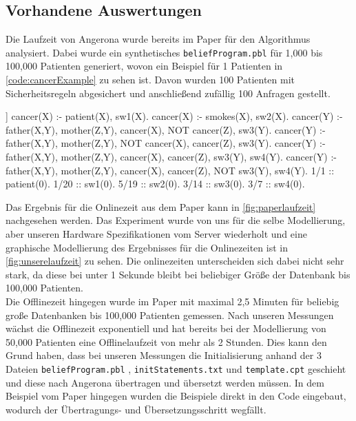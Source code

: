 \documentclass[german,version-2020-11]{uzl-thesis}
\begin{document}
\subsection{Vorhandene Auswertungen}
Die Laufzeit von Angerona wurde bereits im Paper für den Algorithmus analysiert. Dabei wurde ein synthetisches \texttt{beliefProgram.pbl} für 1,000 bis 100,000 Patienten generiert, wovon ein Beispiel für 1 Patienten in \autoref{code:cancerExample} zu sehen ist. Davon wurden 100 Patienten mit Sicherheitsregeln abgesichert und anschließend zufällig 100 Anfragen gestellt. \\ 
\begin{Pseudocode}[caption={\texttt{beliefProgram.pbl} für das Beispiel aus dem Paper \cite{6}}, label={code:cancerExample}]]
cancer(X) :- patient(X), sw1(X).
cancer(X) :- smokes(X), sw2(X).
cancer(Y) :- father(X,Y), mother(Z,Y), cancer(X), NOT cancer(Z), sw3(Y).
cancer(Y) :- father(X,Y), mother(Z,Y), NOT cancer(X), cancer(Z), sw3(Y).
cancer(Y) :- father(X,Y), mother(Z,Y), cancer(X), cancer(Z), sw3(Y), sw4(Y).
cancer(Y) :- father(X,Y), mother(Z,Y), cancer(X), cancer(Z), NOT sw3(Y), sw4(Y).
1/1 :: patient(0).
1/20 :: sw1(0).
5/19 :: sw2(0).
3/14 :: sw3(0).
3/7 :: sw4(0).
\end{Pseudocode}
Das Ergebnis für die Onlinezeit aus dem Paper kann in \autoref{fig:paperlaufzeit} nachgesehen werden. Das Experiment wurde von uns für die selbe Modellierung, aber unseren Hardware Spezifikationen vom Server wiederholt und eine graphische Modellierung des Ergebnisses für die Onlinezeiten ist in \autoref{fig:unserelaufzeit} zu sehen. Die onlinezeiten unterscheiden sich dabei nicht sehr stark, da diese bei unter 1 Sekunde bleibt bei beliebiger Größe der Datenbank bis 100,000 Patienten. \\
Die Offlinezeit hingegen wurde im Paper mit maximal 2,5 Minuten für beliebig große Datenbanken bis 100,000 Patienten gemessen. Nach unseren Messungen wächst die Offlinezeit exponentiell und hat bereits bei der Modellierung von 50,000 Patienten eine Offlinelaufzeit von mehr als 2 Stunden. Dies kann den Grund haben, dass bei unseren Messungen die Initialisierung anhand der 3 Dateien \texttt{beliefProgram.pbl} , \texttt{initStatements.txt} und \texttt{template.cpt} geschieht und diese nach Angerona übertragen und übersetzt werden müssen. In dem Beispiel vom Paper hingegen wurden die Beispiele direkt in den Code eingebaut, wodurch der Übertragungs- und Übersetzungsschritt wegfällt. 
\end{document}

